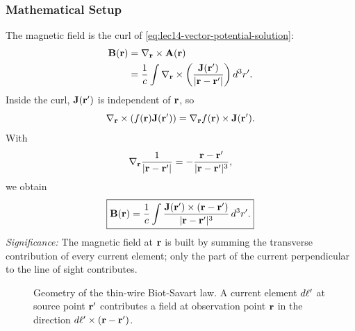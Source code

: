\subsubsection*{Mathematical Setup}
The magnetic field is the curl of \eqref{eq:lec14-vector-potential-solution}:
\begin{align}
  \mathbf{B}(\mathbf{r})
  &= \nabla_{\mathbf{r}}\times\mathbf{A}(\mathbf{r}) \notag\\
  &= \frac{1}{c}\int
     \nabla_{\mathbf{r}}\times
     \left(\frac{\mathbf{J}(\mathbf{r}')}{|\mathbf{r}-\mathbf{r}'|}\right)d^3r'. \label{eq:lec14-B-curl-integral}
\end{align}
Inside the curl, $\mathbf{J}(\mathbf{r}')$ is independent of $\mathbf{r}$, so
\begin{equation}\label{eq:lec14-curl-fJ}
  \nabla_{\mathbf{r}}\times\left(f(\mathbf{r})\mathbf{J}(\mathbf{r}')\right)
  = \nabla_{\mathbf{r}}f(\mathbf{r})\times\mathbf{J}(\mathbf{r}').
\end{equation}
With
\begin{equation}\label{eq:lec14-grad-green}
  \nabla_{\mathbf{r}}\frac{1}{|\mathbf{r}-\mathbf{r}'|}
  = -\frac{\mathbf{r}-\mathbf{r}'}{|\mathbf{r}-\mathbf{r}'|^3},
\end{equation}
we obtain
\begin{equation}\label{eq:lec14-biot-savart-volume}
  \boxed{
    \mathbf{B}(\mathbf{r})=\frac{1}{c}\int
    \frac{\mathbf{J}(\mathbf{r}')\times(\mathbf{r}-\mathbf{r}')}{|\mathbf{r}-\mathbf{r}'|^3}\,d^3r' .
  }
\end{equation}
\textit{Significance:} The magnetic field at $\mathbf{r}$ is built by summing the transverse
contribution of every current element; only the part of the current perpendicular to
the line of sight contributes.

\begin{figure}[h]
\centering
{}
\caption{Geometry of the thin-wire Biot-Savart law.  A current element
$d\mathbf{\ell}'$ at source point $\mathbf{r}'$ contributes a field at observation point $\mathbf{r}$
in the direction $d\mathbf{\ell}'\times(\mathbf{r}-\mathbf{r}')$.}
\label{fig:lec14-biot-savart-geometry}
\end{figure}

